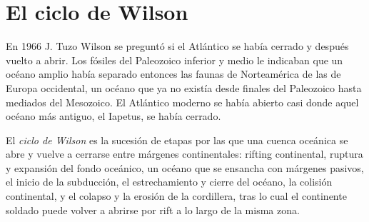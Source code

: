 \begin{omfigure}
\par{}
\end{omfigure}

\section{El ciclo de Wilson}\label{sec:b2:wilson-cycle:cycle}

En 1966 J. Tuzo Wilson se preguntó si el Atlántico se había cerrado y después
vuelto a abrir. Los fósiles del Paleozoico inferior y medio le indicaban que un océano amplio había
separado entonces las faunas de Norteamérica de las de Europa occidental, un océano que ya no
existía desde finales del Paleozoico hasta mediados del Mesozoico. El Atlántico moderno se había abierto
casi donde aquel océano más antiguo, el Iapetus, se había cerrado.

\begin{definition}\label{def:b2:wilson-cycle:wilson}
El \emph{ciclo de Wilson} es la sucesión de etapas por las que una
cuenca oceánica se abre y vuelve a cerrarse entre márgenes continentales: rifting continental,
ruptura y expansión del fondo oceánico, un océano que se ensancha con márgenes pasivos, el inicio de la
subducción, el estrechamiento y cierre del océano, la colisión continental, y el colapso
y la erosión de la cordillera, tras lo cual el continente soldado puede volver a abrirse por rift a lo largo de la misma zona.
\end{definition}

